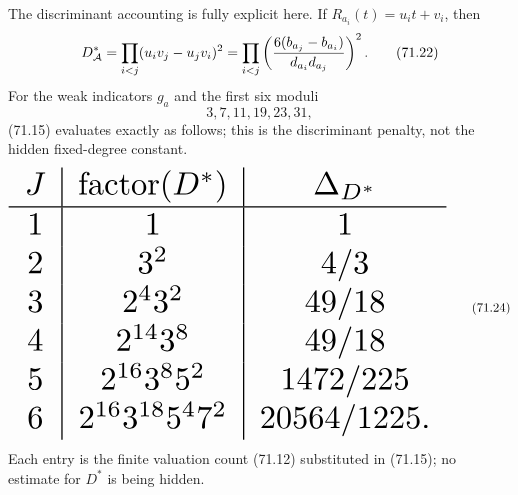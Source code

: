 \documentclass[10pt,reqno]{amsart}
\theoremstyle{definition}
\newcommand{\1}{\mathbf 1}
\begin{document}
The discriminant accounting is fully explicit here.  If
$R_{a_i}(t)=u_it+v_i$, then
\begin{equation}
 D^*_\mathcal A=\prod_{i<j}(u_iv_j-u_jv_i)^2
 =\prod_{i<j}\left({6(b_{a_j}-b_{a_i})\over d_{a_i}d_{a_j}}\right)^2. \tag{71.22}
\end{equation}
For the weak indicators $g_a$ and the first six moduli
\begin{equation}
                     3,7,11,19,23,31,                    \tag{71.23}
\end{equation}
(71.15) evaluates exactly as follows; this is the discriminant penalty,
not the hidden fixed-degree constant.
\begin{equation}
\resizebox{\textwidth}{!}{$
\begin{array}{c|c|c}
J&\operatorname{factor}(D^*)&\Delta_{D^*}\\ \hline
1&1&1\\
2&3^2&4/3\\
3&2^4 3^2&49/18\\
4&2^{14}3^8&49/18\\
5&2^{16}3^8 5^2&1472/225\\
6&2^{16}3^{18}5^4 7^2&20564/1225.
\end{array}
$}                                                          \tag{71.24}
\end{equation}
Each entry is the finite valuation count (71.12) substituted in
(71.15); no estimate for $D^*$ is being hidden.
\end{document}
